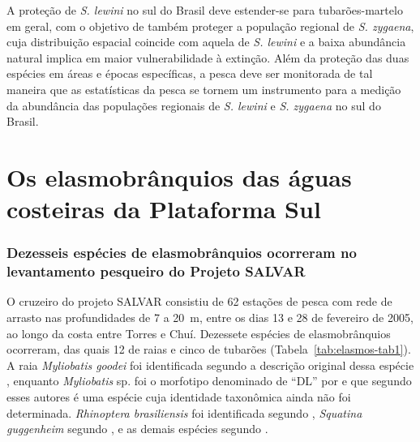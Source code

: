 \documentclass[a4paper,11pt,twoside,showtrims,onecolumn,openright,final]{memoir}
\begin{document}
A proteção de \emph{S. lewini} no sul do Brasil deve estender-se para tubarões-martelo em geral, 
com o objetivo de também proteger a população regional de \emph{S. zygaena}, cuja distribuição espacial 
coincide com aquela de \emph{S. lewini}  e a baixa abundância natural implica em maior vulnerabilidade 
à extinção. Além da proteção das duas espécies em áreas e épocas específicas, a pesca deve ser 
monitorada de tal maneira que as estatísticas da pesca se tornem um instrumento para a medição da 
abundância das populações regionais de \emph{S. lewini} e \emph{S. zygaena} no sul do Brasil. 


 


\chapter{Os elasmobrânquios das águas costeiras da Plataforma Sul}\label{chap:elasmos}




\newpage

\subsection*{Dezesseis espécies de elasmobrânquios ocorreram no levantamento pesqueiro do Projeto SALVAR}

O cruzeiro do projeto SALVAR consistiu de 62 estações de pesca com rede de arrasto nas profundidades 
de 7 a 20~m, entre os dias 13 e 28 de fevereiro de 2005, ao longo da costa entre Torres e Chuí. 
Dezessete espécies de elasmobrânquios ocorreram, das quais 12 de raias e cinco de tubarões (Tabela~\ref{tab:elasmos-tab1}). 
A raia \emph{Myliobatis goodei} foi identificada segundo a descrição original dessa espécie \citep{garman1885}, %
enquanto \emph{Myliobatis} sp. foi  o morfotipo denominado de ``DL'' por \citet{levy1989} %
e que segundo esses autores é uma espécie cuja identidade taxonômica ainda não foi determinada. 
\emph{Rhinoptera brasiliensis} foi identificada segundo \citet{bigelow1953}, %
\emph{Squatina guggenheim} segundo \citet{vooren2003},  e as demais espécies segundo \citet{FIGUEIREDO1977}. %
\end{document}
